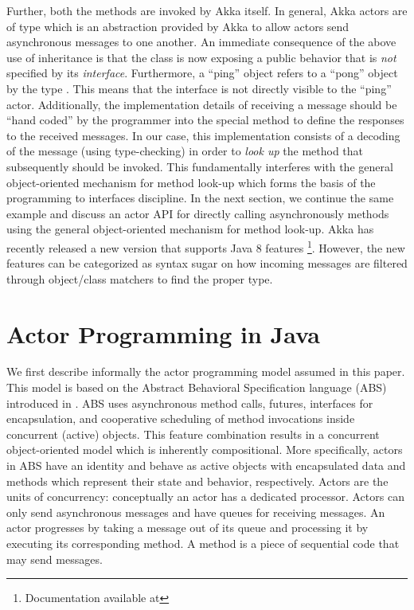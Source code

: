 Further, both the  methods are invoked by Akka  itself. 
In general, Akka actors are of type   which is an abstraction provided by Akka to allow actors send asynchronous messages to one another.
% 
An immediate consequence  of the above use of inheritance is that the class  is now exposing a public behavior 
that is \emph{not} specified by its \emph{interface}. 
Furthermore, a ``ping'' object refers to a ``pong'' object by the type  .
This means that the interface  is not directly visible to the ``ping'' actor.
Additionally, the implementation details of receiving a message should be 
``hand coded'' by the programmer into the  special method  to define the  responses to the received messages.
In our case, this implementation consists of a decoding of the message  (using type-checking)
in order to \emph{look up} the method that subsequently should be invoked.
This fundamentally interferes with the general object-oriented mechanism for method look-up which forms the basis of the programming to interfaces discipline.
In the next section, we continue the same example and discuss an actor API for directly calling asynchronously methods
using the general object-oriented mechanism for method look-up.
Akka has recently released a new version that supports Java 8 features
\footnote{Documentation available at }.
However, the new features can be categorized as syntax sugar on how incoming messages are filtered through object/class matchers to find the proper type.

\section{Actor Programming in Java}
\label{ch03:sec:actor:programming}

We first describe informally the actor programming model assumed in this paper. This model is based on the
Abstract Behavioral Specification language (ABS)  
introduced in \cite{johnsen2012abs}.
ABS uses asynchronous method calls, futures, interfaces for encapsulation, 
and cooperative scheduling of method invocations inside concurrent (active) objects. 
This feature combination results in a concurrent object-oriented model which is inherently compositional.
More specifically, actors in ABS  have an identity and behave as active
objects with encapsulated data and methods which represent their state
and behavior, respectively.  Actors are the units of concurrency: conceptually an actor has a dedicated processor. Actors can only send
asynchronous messages and have queues for receiving messages.  An
actor progresses by taking a message out of its queue and processing
it by executing its corresponding method.  A method is a piece of
sequential code that may send messages.
% 

